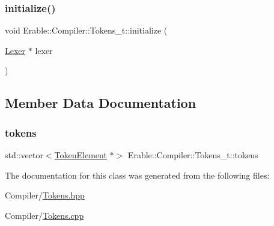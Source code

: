 \mbox{\label{class_erable_1_1_compiler_1_1_tokens__t_a26021ac374aac74592831644583b0bbe}} 
\subsubsection{\texorpdfstring{initialize()}{initialize()}}
{\footnotesize\ttfamily void Erable\+::\+Compiler\+::\+Tokens\+\_\+t\+::initialize (\begin{DoxyParamCaption}\item[{\mbox{\hyperlink{class_lexer}{Lexer}} $\ast$}]{lexer }\end{DoxyParamCaption})}



\subsection{Member Data Documentation}
\mbox{\label{class_erable_1_1_compiler_1_1_tokens__t_a9c933a1377e829ec2b6b84a7e0417d98}} 
\subsubsection{\texorpdfstring{tokens}{tokens}}
{\footnotesize\ttfamily std\+::vector$<$\mbox{\hyperlink{class_erable_1_1_compiler_1_1_token_element}{Token\+Element}} $\ast$$>$ Erable\+::\+Compiler\+::\+Tokens\+\_\+t\+::tokens}



The documentation for this class was generated from the following files\+:\begin{DoxyCompactItemize}
\item 
Compiler/\mbox{\hyperlink{_tokens_8hpp}{Tokens.\+hpp}}\item 
Compiler/\mbox{\hyperlink{_tokens_8cpp}{Tokens.\+cpp}}\end{DoxyCompactItemize}
